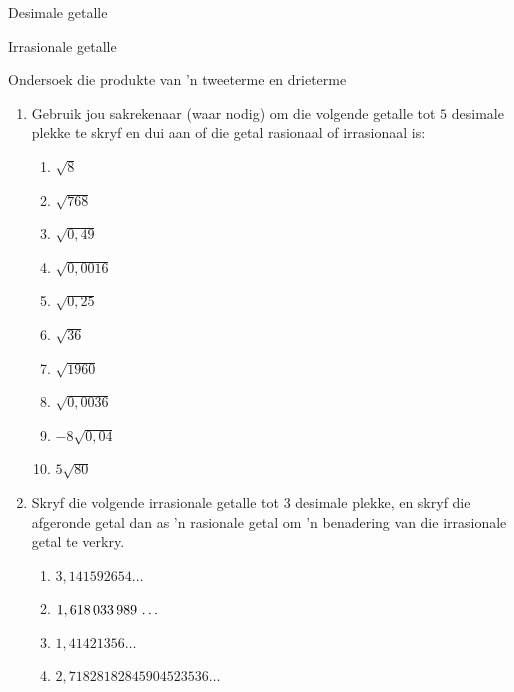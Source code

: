 \begin{Aktiwiteit}{Desimale getalle}
\begin{aktiwiteit}{Irrasionale getalle}
\begin{aktiwiteit}{Ondersoek die produkte van 'n tweeterme en drieterme}
\begin{eocexercises}{}
\begin{enumerate}[itemsep=5pt, label=\textbf{\arabic*}. ]
\item Gebruik jou sakrekenaar (waar nodig) om die volgende getalle tot  $5$ desimale plekke te skryf en dui aan of die getal rasionaal of irrasionaal is:
\begin{multicols}{2}
    \begin{enumerate}[itemsep=5pt, label=\textbf{\alph*}. ] 
    \item $\sqrt{8}$
    \item $\sqrt{768}$
    \item $\sqrt{0,49}$
    \item $\sqrt{0,0016}$
    \item $\sqrt{0,25}$
    \item $\sqrt{36}$
    \item $\sqrt{1960}$
    \item $\sqrt{0,0036}$
    \item $-8\sqrt{0,04}$
    \item $5\sqrt{80}$
    \end{enumerate}
\end{multicols}

\item Skryf die volgende irrasionale getalle tot $3$ desimale plekke, en skryf die afgeronde getal dan as ’n rasionale getal om ’n benadering van die irrasionale getal te verkry.
\begin{multicols}{2}
\begin{enumerate}[itemsep=5pt, label=\textbf{\alph*}. ] 
    \item $3,141592654\ldots$
    \item $1,618\phantom{\rule{0.166667em}{0ex}}033\phantom{\rule{0.166667em}{0ex}}989\phantom{\rule{0.166667em}{0ex}}\ldots$
    \item $1,41421356\ldots$
    \item $2,71828182845904523536\ldots$
    \end{enumerate}
\end{multicols}




\end{enumerate}
\end{eocexercises}
\end{aktiwiteit}
\end{aktiwiteit}
\end{Aktiwiteit}
